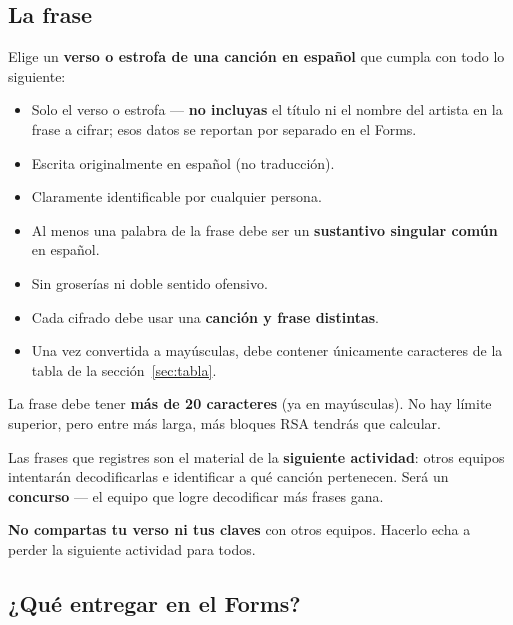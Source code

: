 \documentclass[12pt, oneside]{article}
\begin{document}
\subsection{La frase}

Elige un \textbf{verso o estrofa de una canción en español} que cumpla
con todo lo siguiente:

\begin{itemize}
  \item Solo el verso o estrofa — \textbf{no incluyas} el título ni
        el nombre del artista en la frase a cifrar; esos datos se
        reportan por separado en el Forms.
  \item Escrita originalmente en español (no traducción).
  \item Claramente identificable por cualquier persona.
  \item Al menos una palabra de la frase debe ser un
        \textbf{sustantivo singular común} en español.
  \item Sin groserías ni doble sentido ofensivo.
  \item Cada cifrado debe usar una \textbf{canción y frase distintas}.
  \item Una vez convertida a mayúsculas, debe contener únicamente
        caracteres de la tabla de la sección~\ref{sec:tabla}.
\end{itemize}

\begin{consejo}
  La frase debe tener \textbf{más de 20 caracteres} (ya en mayúsculas).
  No hay límite superior, pero entre más larga, más bloques RSA tendrás
  que calcular.
\end{consejo}

\begin{advertencia}
  Las frases que registres son el material de la \textbf{siguiente
  actividad}: otros equipos intentarán decodificarlas e identificar
  a qué canción pertenecen.  Será un \textbf{concurso} — el equipo
  que logre decodificar más frases gana.

  \medskip
  \textbf{No compartas tu verso ni tus claves} con otros equipos.
  Hacerlo echa a perder la siguiente actividad para todos.
\end{advertencia}

\subsection{¿Qué entregar en el Forms?}
\label{sec:entrega}
\end{document}
